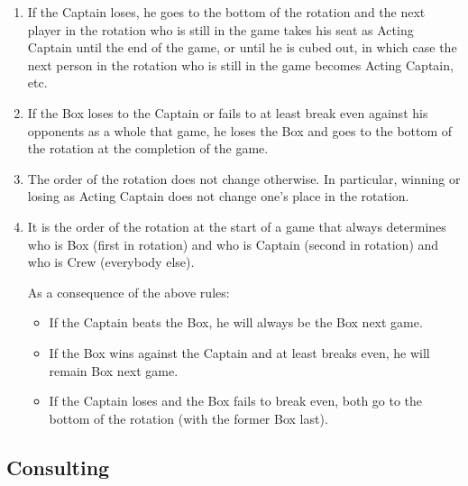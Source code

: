 \documentclass[11pt]{article}
\begin{document}
\begin{enumerate}
\item If the Captain loses, he goes to the bottom of the rotation and the
next player in the rotation who is still in the game takes his seat
as Acting Captain until the end of the game, or until he is cubed out,
in which case the next person in the rotation who is still in the
game becomes Acting Captain, etc.

\item If the Box loses to the Captain or fails to at least break even
against his opponents as a whole that game, he loses the Box and goes
to the bottom of the rotation at the completion of the game.

\item The order of the rotation does not change otherwise.  In particular,
winning or losing as Acting Captain does not change one's place in the
rotation.

\item It is the order of the rotation at the start of a game that always
  determines who is Box (first in rotation) and who is Captain (second in
  rotation) and who is Crew (everybody else).

As a consequence of the above rules:
\begin{itemize}
  \item If the Captain beats the Box, he will always be the Box next game.

  \item If the Box wins against the Captain and at least breaks even, he
    will remain Box next game.

  \item If the Captain loses and the Box fails to break even, both go to
    the bottom of the rotation (with the former Box last).
\end{itemize}

\end{enumerate}

\subsection*{Consulting}
\end{document}
